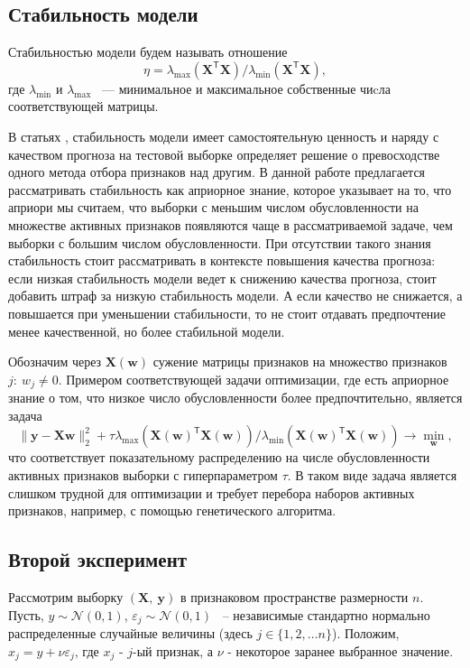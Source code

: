 \documentclass[12pt, twoside]{article}
\newcommand{\by}{\mathbf{y}}
\newcommand{\bw}{\mathbf{w}}
\newcommand{\bX}{\mathbf{X}}
\newcommand{\cN}{\mathcal{N}}
\newcommand{\getT}{^{\mathsf{T}}}
\begin{document}
\subsection{Стабильность модели}
Стабильностью модели будем называть отношение $$\eta = \lambda_{\max}(\bX\getT\bX) / \lambda_{\min}(\bX\getT\bX),$$ где $\lambda_{\min}$ и $\lambda_{\max}$ ~--- минимальное и максимальное собственные чиcла соответствующей матрицы.

В статьях \cite{Katrutsa15, KatrutsaS17},  стабильность модели имеет самостоятельную ценность и наряду с качеством прогноза на тестовой выборке определяет решение о превосходстве одного метода отбора признаков над другим. В данной работе предлагается рассматривать стабильность как априорное знание, которое указывает на то, что априори мы считаем, что выборки с меньшим числом обусловленности на множестве активных признаков появляются чаще в рассматриваемой задаче, чем выборки с большим числом обусловленности. При отсутствии такого знания стабильность стоит рассматривать в контексте повышения качества прогноза: если низкая стабильность модели ведет к снижению качества прогноза, стоит добавить штраф за низкую стабильность модели. А если качество не снижается, а повышается при уменьшении стабильности, то не стоит отдавать предпочтение менее качественной, но более стабильной модели. 

Обозначим через $\bX(\bw)$ сужение матрицы признаков на множество признаков $j:\:w_j \neq 0$. Примером соответствующей задачи оптимизации, где есть априорное знание о том, что низкое число обусловленности более предпочтительно, является задача 
$$
\|\by - \bX \bw\|_2^2 + \tau \lambda_{\max}(\bX(\bw)\getT\bX(\bw)) / \lambda_{\min}(\bX(\bw)\getT\bX(\bw)) \to \min_{\bw},
$$
что соответствует показательному распределению на числе обусловленности активных признаков выборки с гиперпараметром $\tau$. В таком виде задача является слишком трудной для оптимизации и требует перебора наборов активных признаков, например, с помощью генетического алгоритма.

\subsection{Второй эксперимент}

Рассмотрим выборку $(\bX, \:\by)$ в признаковом пространстве размерности $n$. Пусть, $y \sim \cN(0, 1)$, $ \varepsilon_j \sim \cN(0, 1)$ ~-- независимые стандартно нормально распределенные случайные величины (здесь $j \in \{1, 2, ... n\}$). Положим, $x_j = y + \nu \varepsilon_j$, где $x_j$ - $j$-ый признак, а $\nu$ - некоторое заранее выбранное значение.
\end{document}
